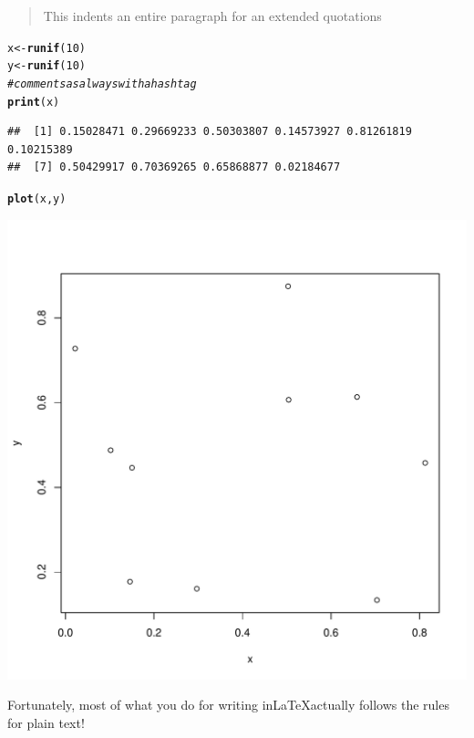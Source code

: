 \documentclass{article}\usepackage[]{graphicx}\usepackage[]{color}
\makeatletter
\def\maxwidth{ %
  \ifdim\Gin@nat@width>\linewidth
    \linewidth
  \else
    \Gin@nat@width
  \fi
}
\newcommand{\hlnum}[1]{\textcolor[rgb]{0.686,0.059,0.569}{#1}}%
\newcommand{\hlcom}[1]{\textcolor[rgb]{0.678,0.584,0.686}{\textit{#1}}}%
\newcommand{\hlstd}[1]{\textcolor[rgb]{0.345,0.345,0.345}{#1}}%
\newcommand{\hlkwb}[1]{\textcolor[rgb]{0.69,0.353,0.396}{#1}}%
\newcommand{\hlkwd}[1]{\textcolor[rgb]{0.737,0.353,0.396}{\textbf{#1}}}%
\newenvironment{kframe}{%
 \def\at@end@of@kframe{}%
 \ifinner\ifhmode%
  \def\at@end@of@kframe{\end{minipage}}%
  \begin{minipage}{\columnwidth}%
 \fi\fi%
 \def\FrameCommand##1{\hskip\@totalleftmargin \hskip-\fboxsep
 \colorbox{shadecolor}{##1}\hskip-\fboxsep
     \hskip-\linewidth \hskip-\@totalleftmargin \hskip\columnwidth}%
 \MakeFramed {\advance\hsize-\width
   \@totalleftmargin\z@ \linewidth\hsize
   \@setminipage}}%
 {\par\unskip\endMakeFramed%
 \at@end@of@kframe}
\newenvironment{knitrout}{}{} %
\makeatother
\begin{document}
\begin{quote}
This indents an entire paragraph for an extended quotations
\end{quote}


\begin{knitrout}
\color{fgcolor}\begin{kframe}
\begin{alltt}
\hlstd{x}\hlkwb{<-}\hlkwd{runif}\hlstd{(}\hlnum{10}\hlstd{)}
\hlstd{y}\hlkwb{<-}\hlkwd{runif}\hlstd{(}\hlnum{10}\hlstd{)}
\hlcom{#comments as always with a hashtag}
\hlkwd{print}\hlstd{(x)}
\end{alltt}
\begin{verbatim}
##  [1] 0.15028471 0.29669233 0.50303807 0.14573927 0.81261819 0.10215389
##  [7] 0.50429917 0.70369265 0.65868877 0.02184677
\end{verbatim}
\begin{alltt}
\hlkwd{plot}\hlstd{(x,y)}
\end{alltt}
\end{kframe}
\includegraphics[width=\maxwidth]{figure/unnamed-chunk-1-1} 

\end{knitrout}

\lipsum[1-2]

Fortunately, most of what you do for writing in\LaTeX actually follows the rules for plain text!
\end{document}
